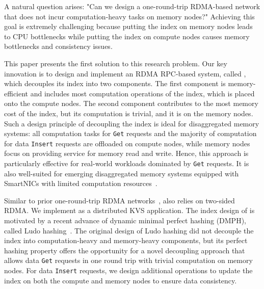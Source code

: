 A natural question arises: "Can we design a one-round-trip RDMA-based network that does not incur computation-heavy tasks on memory nodes?" 
Achieving this goal is extremely challenging because putting the index on memory nodes leads to CPU bottlenecks while putting the index on compute nodes causes memory bottlenecks and consistency issues. 

This paper presents the first solution to this research problem.
Our key innovation is to design and implement an RDMA RPC-based system, called \sys, which decouples its index into two components. The first component is memory-efficient and includes most computation operations of the index, which is placed onto the compute nodes. The second component contributes to the most memory cost of the index, but its computation is trivial, and it is on the memory nodes. 
Such a design principle of decoupling the index is ideal for disaggregated memory systems: all computation tasks for \texttt{Get} requests and the majority of computation for data \texttt{Insert} requests are offloaded on compute nodes, while memory nodes focus on providing service for memory read and write. Hence, this approach is particularly effective for real-world workloads dominated by \texttt{Get} requests. It is also well-suited for emerging disaggregated memory systems equipped with SmartNICs with limited computation resources~\cite{bluefield, alveo, stingray}.

Similar to prior one-round-trip RDMA networks~\cite{fasst,guidelines}, \sys also relies on two-sided RDMA. %
We implement \sys as a distributed KVS application. The index design of \sys is motivated by a recent advance of dynamic minimal perfect hashing (DMPH), called Ludo hashing~\cite{ludo}. 
The original design of Ludo hashing did not decouple the index into computation-heavy and memory-heavy components, but its perfect hashing property offers the opportunity for a novel decoupling approach that allows data \texttt{Get} requests in one round trip with trivial computation on memory nodes. 
For data \texttt{Insert} requests, we design additional operations to update the index on both the compute and memory nodes to ensure data consistency. 









